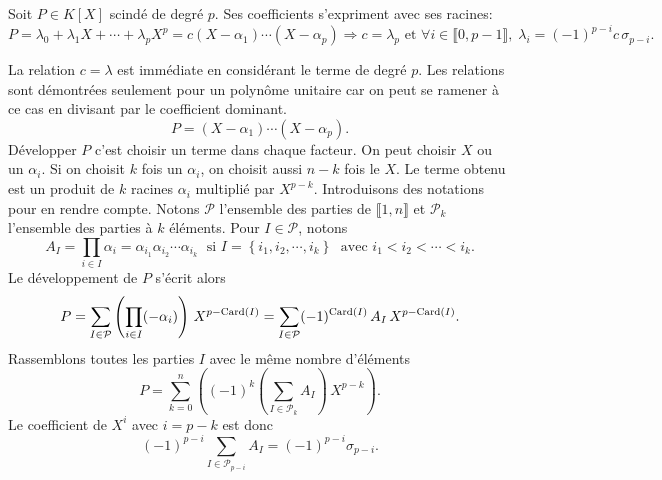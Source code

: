 \begin{prop}
 Soit $P\in K[X]$ scindé de degré $p$. Ses coefficients s'expriment avec ses racines: 
\begin{displaymath}
 P = \lambda_0 + \lambda_1 X  + \cdots + \lambda_p X^p = c (X-\alpha_1)\cdots (X-\alpha_p)
 \Rightarrow c= \lambda_p \text{ et } \forall i\in \llbracket 0, p-1\rrbracket,\; \lambda_i = (-1)^{p-i}c \,\sigma_{p-i}.
\end{displaymath}
\end{prop}
\begin{demo}
 La relation $c = \lambda$ est immédiate en considérant le terme de degré $p$. Les relations sont démontrées seulement pour un polynôme unitaire car on peut se ramener à ce cas en divisant par le coefficient dominant.
 \[
   P = (X-\alpha_1)\cdots (X-\alpha_p).
 \]
 Développer $P$ c'est choisir un terme dans chaque facteur. On peut choisir $X$ ou un $\alpha_i$. Si on choisit $k$ fois un $\alpha_i$, on choisit aussi $n-k$ fois le $X$. Le terme obtenu est un produit de $k$ racines $\alpha_i$ multiplié par $X^{p-k}$. Introduisons des notations pour en rendre compte.\newline
Notons $\mathcal{P}$ l'ensemble des parties de $\llbracket 1,n \rrbracket$ et $\mathcal{P}_k$ l'ensemble des parties à $k$ éléments.\newline
Pour $I\in \mathcal{P}$, notons
\[
  A_I = \prod_{i \in I}\alpha_i = \alpha_{i_1}\alpha_{i_2}\cdots\alpha_{i_k} \; \text{ si } I = \left\lbrace i_1, i_2, \cdots, i_k \right\rbrace \;\text{ avec } i_1 < i_2 < \cdots <i_k.
\]
Le développement de $P$ s'écrit alors
\[
  P = \sum_{I \in \mathcal{P}} \left( \prod_{i \in I}(-\alpha_i)\right) \, X^{p-\mathop{\mathrm{Card}}(I)}
  = \sum_{I \in \mathcal{P}} (-1)^{\mathop{\mathrm{Card}}(I)} \, A_I \, X^{p-\mathop{\mathrm{Card}}(I)}.
\]
Rassemblons toutes les parties $I$ avec le même nombre d'éléments
 \[
   P = \sum_{k=0}^{n} \left( (-1)^{k} \left(\sum_{I \in \mathcal{P}_k} A_I\right) \, X^{p-k} \right).
 \]
Le coefficient de $X^i$ avec $i = p - k$ est donc
\[
  (-1)^{p - i} \sum_{I \in \mathcal{P}_{p - i}} A_I = (-1)^{p - i} \sigma_{p-i}. 
\]
\end{demo}

